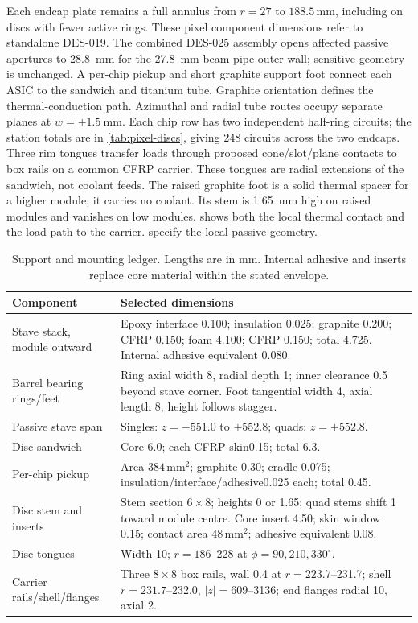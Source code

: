Each endcap plate remains a full annulus from $r=27$ to
$188.5\,\unit{\milli\metre}$, including on discs with fewer active rings.
These pixel component dimensions refer to standalone DES-019. The combined
DES-025 assembly opens affected passive apertures to
\qty{28.8}{\milli\metre} for the \qty{27.8}{\milli\metre} beam-pipe
outer wall; sensitive geometry is unchanged.
A per-chip pickup and short graphite support foot connect each ASIC to the sandwich
and titanium tube. Graphite orientation defines the thermal-conduction
path.\cite{graphite,tepx} Azimuthal and radial tube routes occupy separate
planes at $w=\pm\qty{1.5}{\milli\metre}$. Each chip row has two independent
half-ring circuits; the station totals are in \cref{tab:pixel-discs}, giving
\num{248} circuits across the two endcaps. Three rim tongues transfer loads
through proposed cone/slot/plane contacts to box rails on a common CFRP carrier.
These tongues are radial extensions of the sandwich, not coolant feeds.
The raised graphite foot is a solid thermal spacer for a higher module; it
carries no coolant. Its stem is \qty{1.65}{\milli\metre} high on raised
modules and vanishes on low modules. 
shows both the local thermal contact and the load path to the carrier.
 specify the local passive geometry.

\begin{table}[!htbp]
\caption{Support and mounting ledger. Lengths are in \unit{\milli\metre}.
Internal adhesive and inserts replace core material within the stated envelope.}
\label{tab:pixel-support}
\centering\small
\begin{tabular}{@{}p{.35\linewidth}p{.59\linewidth}@{}}\toprule
Component & Selected dimensions\\\midrule
Stave stack, module outward & Epoxy interface 0.100; insulation 0.025; graphite 0.200;
CFRP 0.150; foam 4.100; CFRP 0.150; total 4.725. Internal adhesive equivalent 0.080.\\
Barrel bearing rings/feet & Ring axial width 8, radial depth 1; inner clearance 0.5
beyond stave corner. Foot tangential width 4, axial length 8; height follows stagger.\\
Passive stave span & Singles: $z=-551.0$ to $+552.8$; quads: $z=\pm552.8$.\\
Disc sandwich & Core 6.0; each CFRP skin0.15; total 6.3.\\
Per-chip pickup & Area $384\,\unit{\milli\metre\squared}$; graphite 0.30;
cradle 0.075; insulation/interface/adhesive0.025 each; total 0.45.\\
Disc stem and inserts & Stem section $6\times8$; heights 0 or 1.65; quad stems
shift 1 toward module centre. Core insert 4.50; skin window 0.15;
contact area $48\,\unit{\milli\metre\squared}$; adhesive equivalent 0.08.\\
Disc tongues & Width 10; $r=186$--228 at $\phi=90,210,330^{\circ}$.\\
Carrier rails/shell/flanges & Three $8\times8$ box rails, wall 0.4 at
$r=223.7$--231.7; shell $r=231.7$--232.0, $|z|=609$--3136;
end flanges radial 10, axial 2.\\\bottomrule
\end{tabular}
\end{table}

